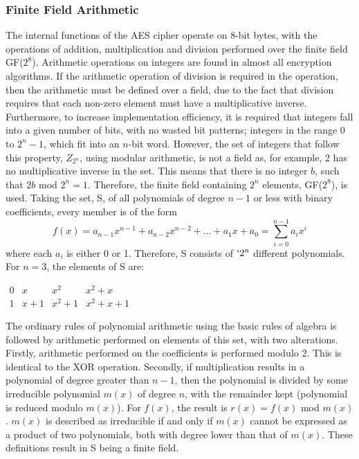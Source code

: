\documentclass[a4paper,12pt]{report}
\begin{document}
\subsubsection{Finite Field Arithmetic}

The internal functions of the AES cipher operate on 8-bit bytes, with the operations of addition, multiplication and division performed over the finite field GF($2^{8}$).
Arithmetic operations on integers are found in almost all encryption algorithms. If the arithmetic operation of division is required in the operation, then the arithmetic must be defined over a field, due to the fact that division requires that each non-zero element must have a multiplicative inverse. Furthermore, to increase implementation efficiency, it is required that integers fall into a given number of bits, with no wasted bit patterns; integers in the range 0 to $2^{n} - 1$, which fit into an $n$-bit word. However, the set of integers that follow this property, $Z_{2^{n}}$, using modular arithmetic, is not a field as, for example, 2 has no multiplicative inverse in the set. This means that there is no integer $b$, such that $2b$ mod $2^{n} = 1$. Therefore, the finite field containing $2^{n}$ elements, GF($2^{8}$), is used. Taking the set, S, of all polynomials of degree $n - 1$ or less with binary coefficients, every member is of the form
\[f(x) = a_{n-1}x^{n-1} + a_{n-2}x^{n-2} + ... + a_{1}x + a_{0} = \sum_{i=0}^{n-1}a_{i}x^{i}\] 
where each $a_{i}$ is either 0 or 1. Therefore, S consists of $`2^{n}$ different polynomials. For $n = 3$, the elements of S are:
\begin{center}
$
\begin{matrix}
  0 & x & x^{2} & x^{2} + x \\
  1 & x + 1 & x^{2} + 1 & x^{2} + x + 1 
 \end{matrix}
$
\end{center}
The ordinary rules of polynomial arithmetic using the basic rules of algebra is followed by arithmetic performed on elements of this set, with two alterations. Firstly, arithmetic performed on the coefficients is performed modulo 2. This is identical to the XOR operation. Secondly, if multiplication results in a polynomial of degree greater than $n - 1$, then the polynomial is divided by some irreducible polynomial $m(x)$ of degree $n$, with the remainder kept (polynomial is reduced modulo $m(x)$). For $f(x)$, the result is $r(x) = f(x)$ mod $m(x)$. $m(x)$ is described as irreducible if and only if $m(x)$ cannot be expressed as a product of two polynomials, both with degree lower than that of $m(x)$. These definitions result in S being a finite field.
\end{document}
